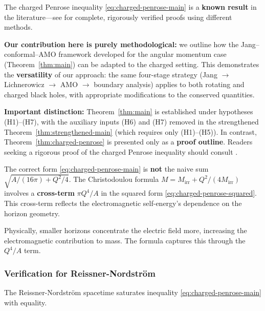 \begin{remark}\label{rem:charged-novelty}
The charged Penrose inequality \eqref{eq:charged-penrose-main} is a \textbf{known result} in the literature---see \cite{mars2009, khuri2015charged} for complete, rigorously verified proofs using different methods. 

\textbf{Our contribution here is purely methodological:} we outline how the Jang--conformal--AMO framework developed for the angular momentum case (Theorem~\ref{thm:main}) can be adapted to the charged setting. This demonstrates the \textbf{versatility} of our approach: the same four-stage strategy (Jang $\to$ Lichnerowicz $\to$ AMO $\to$ boundary analysis) applies to both rotating and charged black holes, with appropriate modifications to the conserved quantities.

\textbf{Important distinction:} Theorem~\ref{thm:main} is established under hypotheses (H1)--(H7), with the auxiliary inputs (H6) and (H7) removed in the strengthened Theorem~\ref{thm:strengthened-main} (which requires only (H1)--(H5)). In contrast, Theorem~\ref{thm:charged-penrose} is presented only as a \textbf{proof outline}. Readers seeking a rigorous proof of the charged Penrose inequality should consult \cite{mars2009, khuri2015charged}.
\end{remark}

\begin{remark}
The correct form \eqref{eq:charged-penrose-main} is \textbf{not} the naive sum $\sqrt{A/(16\pi) + Q^2/4}$. The Christodoulou formula $M = M_{\mathrm{irr}} + Q^2/(4M_{\mathrm{irr}})$ involves a \textbf{cross-term} $\pi Q^4/A$ in the squared form \eqref{eq:charged-penrose-squared}. This cross-term reflects the electromagnetic self-energy's dependence on the horizon geometry.

Physically, smaller horizons concentrate the electric field more, increasing the electromagnetic contribution to mass. The formula captures this through the $Q^4/A$ term.
\end{remark}

\subsubsection{Verification for Reissner-Nordstr\"om}

\begin{proposition}\label{prop:RN-saturation}
The Reissner-Nordstr\"om spacetime saturates inequality \eqref{eq:charged-penrose-main} with equality.
\end{proposition}

